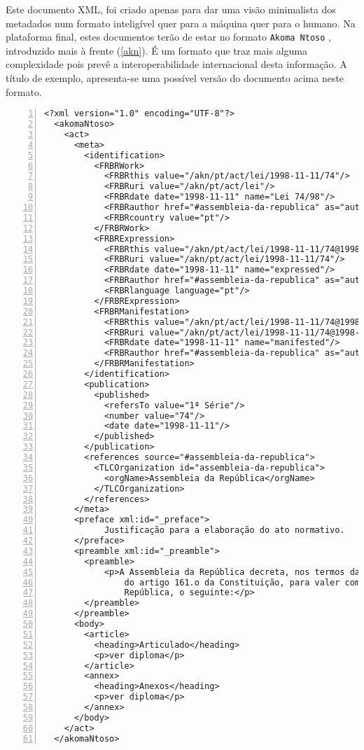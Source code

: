 Este documento XML, foi criado apenas para dar uma visão minimalista dos metadados num formato inteligível quer 
para a máquina quer para o humano. Na plataforma final, estes documentos terão de estar no formato 
\texttt{Akoma Ntoso} \cite{VPCB2018}, introduzido mais à frente (\ref{akn}).
É um formato que traz mais alguma complexidade pois prevê a interoperabilidade internacional desta informação.
A título de exemplo, apresenta-se uma possível versão do documento acima neste formato.

\begin{Verbatim}[frame=single, numbers=left, fontsize=\footnotesize, commandchars=\\\{\}]
<?xml version="1.0" encoding="UTF-8"?>
  <akomaNtoso>
    <act>
      <meta>
        <identification>
          <FRBRWork>
            <FRBRthis value="/akn/pt/act/lei/1998-11-11/74"/>
            <FRBRuri value="/akn/pt/act/lei"/>
            <FRBRdate date="1998-11-11" name="Lei 74/98"/>
            <FRBRauthor href="#assembleia-da-republica" as="author"/>
            <FRBRcountry value="pt"/>
          </FRBRWork>
          <FRBRExpression>
            <FRBRthis value="/akn/pt/act/lei/1998-11-11/74@1998-11-11"/>
            <FRBRuri value="/akn/pt/act/lei/1998-11-11/74"/>
            <FRBRdate date="1998-11-11" name="expressed"/>
            <FRBRauthor href="#assembleia-da-republica" as="author"/>
            <FRBRlanguage language="pt"/>
          </FRBRExpression>
          <FRBRManifestation>
            <FRBRthis value="/akn/pt/act/lei/1998-11-11/74@1998-11-11"/>
            <FRBRuri value="/akn/pt/act/lei/1998-11-11/74@1998-11-11"/>
            <FRBRdate date="1998-11-11" name="manifested"/>
            <FRBRauthor href="#assembleia-da-republica" as="author"/>
          </FRBRManifestation>
        </identification>
        <publication>
          <published>
            <refersTo value="1ª Série"/>
            <number value="74"/>
            <date date="1998-11-11"/>
          </published>
        </publication>
        <references source="#assembleia-da-republica">
          <TLCOrganization id="assembleia-da-republica">
            <orgName>Assembleia da República</orgName>
          </TLCOrganization>
        </references>
      </meta>
      <preface xml:id="_preface">
            Justificação para a elaboração do ato normativo.
      </preface>
      <preamble xml:id="_preamble">
        <preamble>
            <p>A Assembleia da República decreta, nos termos da alínea c)
                do artigo 161.o da Constituição, para valer como lei geral da
                República, o seguinte:</p>
        </preamble>
      </preamble>
      <body>
        <article>
          <heading>Articulado</heading>
          <p>ver diploma</p>
        </article>
        <annex>
          <heading>Anexos</heading>
          <p>ver diploma</p>
        </annex>
      </body>
    </act>
  </akomaNtoso>        
\end{Verbatim}

